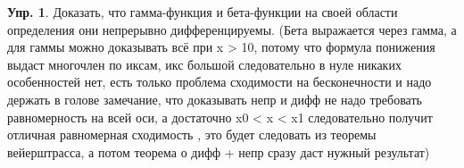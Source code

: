 \documentclass[12pt]{article}
\theoremstyle{definition}
\newtheorem{exrc}{Упр.}
\begin{document}
\begin{exrc}
	Доказать, что гамма-функция и бета-функции на своей области определения они непрерывно дифференцируемы. (Бета выражается через гамма, а для гаммы можно доказывать всё при x > 10, потому что формула понижения выдаст многочлен по иксам, икс большой следовательно в нуле никаких особенностей нет, есть только проблема сходимости на бесконечности и надо держать в голове замечание, что доказывать непр и дифф не надо требовать равномерность на всей оси, а достаточно x0 < x < x1 следовательно получит отличная равномерная сходимость , это будет следовать из теоремы вейерштрасса, а потом теорема о дифф + непр сразу даст нужный результат)
\end{exrc}
\end{document}
